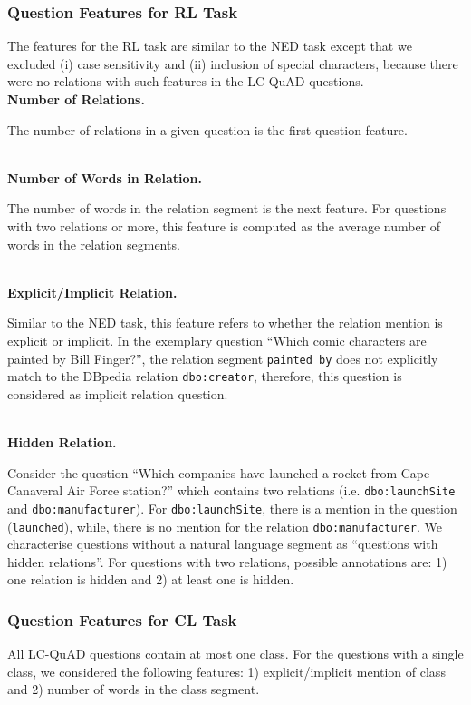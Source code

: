\documentclass[sigconf,edbt]{acmart-edbt2019}
\newcommand{\qq}[1]{``#1''}
\begin{document}
\subsubsection{Question Features for RL Task}
The features for the RL task are similar to the NED task except that we excluded (i) case sensitivity and (ii) inclusion of special characters, because there were no relations with such features in the LC-QuAD questions.
~\\
{\bf Number of Relations.} \begin{inparaenum}
The number of relations in a given question is the first question feature.
\end{inparaenum}
~\\
{\bf Number of Words in Relation.} \begin{inparaenum}
The number of words in the relation segment is the next feature. For questions with two relations or more, this feature is computed as the average number of words in the relation segments.
\end{inparaenum}
~\\
{\bf Explicit/Implicit Relation.} \begin{inparaenum}
Similar to the NED task, this feature refers to whether the relation mention is explicit or implicit. In the exemplary question \qq{Which comic characters are painted by Bill Finger?}, the relation segment \texttt{painted by} does not explicitly match to the DBpedia relation \texttt{dbo:creator}, therefore, this question is considered as implicit relation question.
\end{inparaenum}
~\\
{\bf Hidden Relation.} \begin{inparaenum}
Consider the question \qq{Which companies have launched a rocket from Cape Canaveral Air Force station?} which contains two relations (i.e. \texttt{dbo:launchSite} and \texttt{dbo:manufacturer}). For \texttt{dbo:launchSite}, there is a mention in the question (\texttt{launched}), while, there is no mention for the relation \texttt{dbo:manufacturer}. We characterise questions without a natural language segment as ``questions with hidden relations''. For questions with two relations, possible annotations are: 1) one relation is hidden and 2) at least one is hidden.
\end{inparaenum}

\subsubsection{Question Features for CL Task}
All LC-QuAD questions contain at most one class. For the questions with a single class, we considered the following features: 1) explicit/implicit mention of class and 2) number of words in the class segment. 
\end{document}
